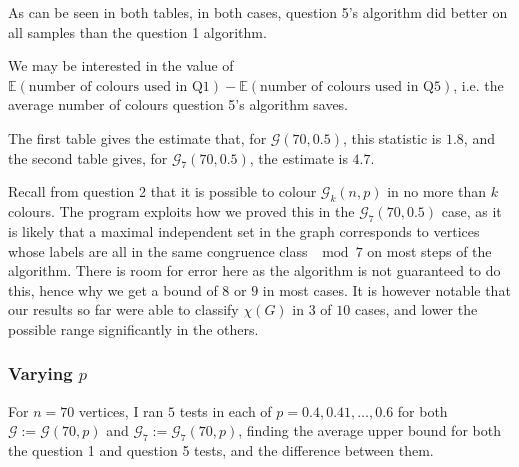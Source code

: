 \documentclass{article}
\begin{document}
  \begin{center}
 \end{center}
 
 As can be seen in both tables, in both cases, question 5's algorithm did better on all samples than the question 1 algorithm.
 
 We may be interested in the value of $\mathbb{E}(\text{number of colours used in Q1}) - \mathbb{E}(\text{number of colours used in Q5})$, i.e. the average number of colours question 5's algorithm saves.
 
The first table gives the estimate that, for $\mathcal{G}(70,0.5)$, this statistic is $1.8$, and the second table gives, for $\mathcal{G}_7(70,0.5)$, the estimate is $4.7$.

Recall from question 2 that it is possible to colour $\mathcal{G}_k(n,p)$ in no more than $k$ colours. The program exploits how we proved this in the $\mathcal{G}_7(70,0.5)$ case, as it is likely that a maximal independent set in the graph corresponds to vertices whose labels are all in the same congruence class $\mod 7$ on most steps of the algorithm. There is room for error here as the algorithm is not guaranteed to do this, hence why we get a bound of $8$ or $9$ in most cases. It is however notable that our results so far were able to classify $\chi(G)$ in $3$ of $10$ cases, and lower the possible range significantly in the others.

\subsubsection{Varying $p$}

For $n=70$ vertices, I ran $5$ tests in each of $p=0.4,0.41,\dots, 0.6$ for both $\mathcal{G} := \mathcal{G}(70,p)$ and $\mathcal{G}_7 := \mathcal{G}_7(70,p)$, finding the average upper bound for both the question 1 and question 5 tests, and the difference between them.
\end{document}
